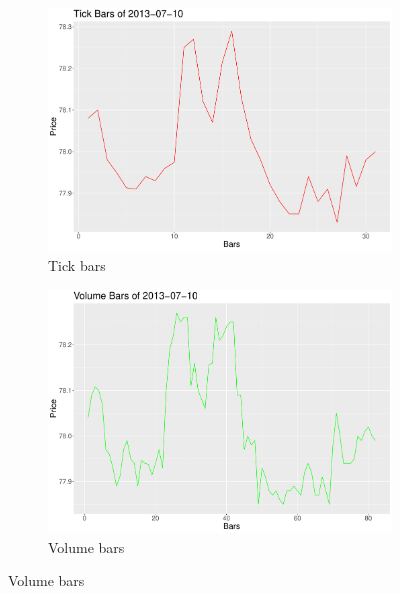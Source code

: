\begin{figure}[htbp]
	\begin{subfigure}{.5\textwidth}
		\centering
		\includegraphics[scale=.25]{img/dataBars/tickZoom}
		\caption{Tick bars}
	\end{subfigure}%
	\begin{subfigure}{.5\textwidth}
		\centering
		\includegraphics[scale=.25]{img/dataBars/volumeZoom}
		\caption{Volume bars}
	\end{subfigure}%

	\vspace{.4cm}


\end{figure}
